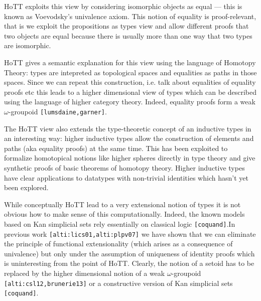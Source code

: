 \documentclass[twocolumn,a4paper,11pt]{article}
\renewcommand{\cite}[1]{{\tt[#1]}}
\begin{document}
HoTT exploits this view by considering isomorphic objects as equal ---
this is known as Voevodsky's univalence axiom. This notion of equality
is proof-relevant, that is we exploit the propositions as
types view and allow different proofs that two objects are equal
because there is usually more than one way that two types are isomorphic.  

HoTT gives a semantic explanation for this view using the language of
Homotopy Theory: types are intepreted
as topological spaces and equalities as paths in those spaces. 
Since we can repeat this construction, i.e. talk about equalities of
equality proofs etc this leads to a higher dimensional view of types
which can be described using the language of higher category theory.
Indeed, equality proofs form a weak $\omega$-groupoid
\cite{lumsdaine,garner}.  

The HoTT view also extends the type-theoretic concept of an inductive
types in an interesting way: higher inductive types allow the
construction of elements and paths (aka equality proofs) at the same
time. This has been exploited to formalize homotopical notions like
higher spheres directly in type theory and give synthetic proofs of
basic theorems of homotopy theory. Higher inductive types have clear
applications to datatypes with non-trivial identities which hasn't yet
been explored. 

While conceptually HoTT lead to a very extensional notion of types it
is not obvious how to make sense of this computationally. Indeed, the
known models based on Kan simplicial sets rely essentially on
classical logic \cite{coquand}.In previous
work \cite{alti:lics01,alti:plpv07} we have shown that we can
eliminate the principle of functional extensionality (which arises as
a consequence of univalence) but only under the assumption of
uniqueness of identity proofs which is uninteresting from the point of
HoTT. Clearly, the notion of a setoid has to be replaced by the higher
dimensional notion of a weak $\omega$-groupoid
\cite{alti:csl12,brunerie13} or a constructive version of Kan
simplicial sets \cite{coquand}.
\end{document}
